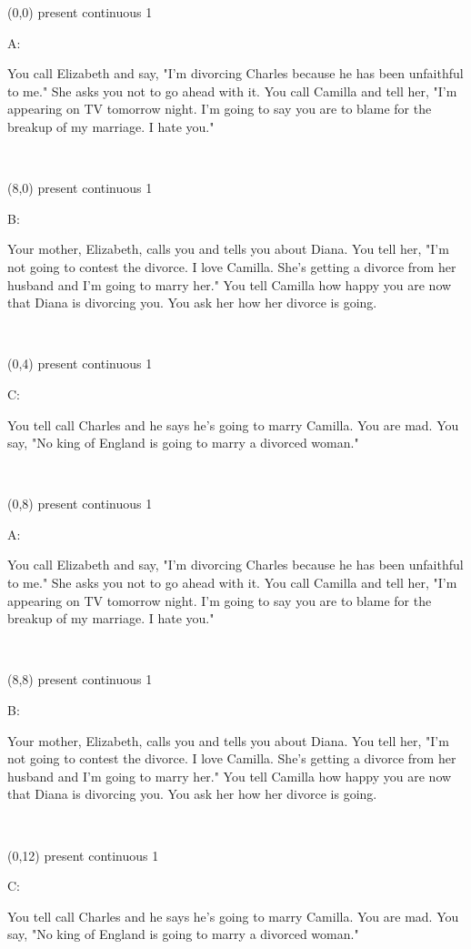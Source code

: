 \documentclass[a4paper]{article}
\newcommand{\myIdentifier}[0]{
present continuous 1
}
\newcommand{\myAcontent}[0]{
You call Elizabeth and say, "I'm divorcing Charles because he has been unfaithful to me." She asks you not to go ahead with it. You call Camilla and tell her, "I'm appearing on TV tomorrow night. I'm going to say you are to blame for the breakup of my marriage. I hate you."
}
\newcommand{\myBcontent}[0]{
Your mother, Elizabeth, calls you and tells you about Diana. You tell her, "I'm not going to contest the divorce. I love Camilla. She's getting a divorce from her husband and I'm going to marry her." You tell Camilla how happy you are now that Diana is divorcing you. You ask her how her divorce is going.
}
\newcommand{\myCcontent}[0]{
You tell call Charles and he says he's going to marry Camilla. You are mad. You say, "No king of England is going to marry a divorced woman."
}
\newcommand{\mycard}[5]{%
	\vspace{0.1cm}
	\small #1 #2
	\par
	\parbox[t][6.7cm][c]{9.5cm}{%
	\hspace{0.1cm} \Large#3\\
	\normalsize#4 #5
	}
}
\begin{document}
\selectfont

\begin{textblock}{8}(0,0)
\mycard{}{\myIdentifier}{\parbox{9.0cm}{A:
\myAcontent
}}{}{} 
\end{textblock}

\begin{textblock}{8}(8,0)
\mycard{}{\myIdentifier}{\parbox{9.0cm}{B:
\myBcontent
}}{}{} 
\end{textblock}

\begin{textblock}{8}(0,4)
\mycard{}{\myIdentifier}{\parbox{9.0cm}{C:
\myCcontent
}}{}{} 
\end{textblock}

\begin{textblock}{8}(0,8)
\mycard{}{\myIdentifier}{\parbox{9.0cm}{A:
\myAcontent
}}{}{} 
\end{textblock}

\begin{textblock}{8}(8,8)
\mycard{}{\myIdentifier}{\parbox{9.0cm}{B:
\myBcontent
}}{}{} 
\end{textblock}

\begin{textblock}{8}(0,12)
\mycard{}{\myIdentifier}{\parbox{9.0cm}{C:
\myCcontent
}}{}{} 
\end{textblock}
\end{document}
